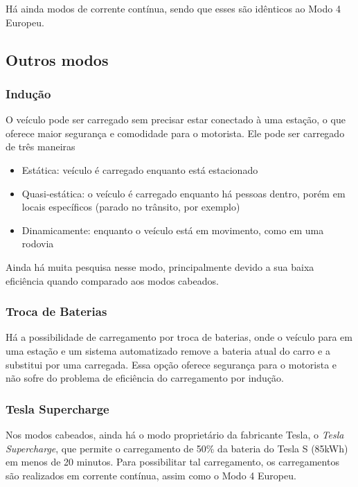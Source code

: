       Há ainda modos de corrente contínua, sendo que esses são idênticos ao Modo 4 Europeu.

    \subsection{Outros modos}
    \label{stateofart:modes:other}

      \subsubsection{Indução}
      \label{stateofart:modes:other:induction}

        O veículo pode ser carregado sem precisar estar conectado à uma estação, o que oferece maior segurança e comodidade para o motorista. Ele pode ser carregado de três maneiras

        \begin{itemize}
          \item Estática: veículo é carregado enquanto está estacionado
          \item Quasi-estática: o veículo é carregado enquanto há pessoas dentro, porém em locais específicos (parado no trânsito, por exemplo)
          \item Dinamicamente: enquanto o veículo está em movimento, como em uma rodovia
        \end{itemize}

        Ainda há muita pesquisa nesse modo, principalmente devido a sua baixa eficiência quando comparado aos modos cabeados.

      \subsubsection{Troca de Baterias}
      \label{stateofart:modes:other:swap}

        Há a possibilidade de carregamento por troca de baterias, onde o veículo para em uma estação e um sistema automatizado remove a bateria atual do carro e a substitui por uma carregada. Essa opção oferece segurança para o motorista e não sofre do problema de eficiência do carregamento por indução.

      \subsubsection{Tesla Supercharge}
      \label{stateofart:modes:tesla}

        Nos modos cabeados, ainda há o modo proprietário da fabricante Tesla, o \textit{Tesla Supercharge}, que permite o carregamento de 50\% da bateria do Tesla S (85kWh) em menos de 20 minutos. Para possibilitar tal carregamento, os carregamentos são realizados em corrente contínua, assim como o Modo 4 Europeu.


